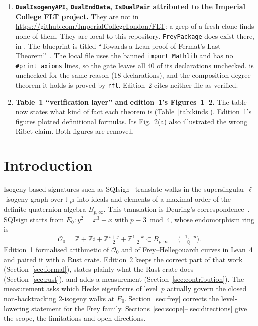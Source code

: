 \documentclass[11pt,a4paper]{article}
\theoremstyle{definition}
\newcommand{\Oz}{\mathcal{O}_0}
\begin{document}
\begin{enumerate}
  \item \textbf{\texttt{DualIsogenyAPI}, \texttt{DualEndData}, \texttt{IsDualPair} attributed to the Imperial College FLT project.} They are not in \url{https://github.com/ImperialCollegeLondon/FLT}: a grep of a fresh clone finds none of them. They are local to this repository. \texttt{FreyPackage} does exist there, in . The blueprint is titled ``Towards a Lean proof of Fermat's Last Theorem''~\cite{BuzzardTaylor}. The local file  uses the banned \texttt{import Mathlib} and has no \texttt{\#print axioms} lines, so the gate leaves all 40 of its declarations unchecked.  is unchecked for the same reason (18 declarations), and the composition-degree theorem it holds is proved by \texttt{rfl}. Edition~2 cites neither file as verified.
  \item \textbf{Table~1 ``verification layer'' and edition~1's Figures~1--2.} The table now states what kind of fact each theorem is (Table~\ref{tab:kinds}). Edition~1's figures plotted definitional formulas. Its Fig.~2(a) also illustrated the wrong Ribet claim. Both figures are removed.
\end{enumerate}

\section{Introduction}
Isogeny-based signatures such as SQIsign~\cite{DeFeo2020,SQIsignSpec} translate walks in the supersingular $\ell$-isogeny graph over $\mathbb F_{p^2}$ into ideals and elements of a maximal order of the definite quaternion algebra $B_{p,\infty}$. This translation is Deuring's correspondence~\cite{Deuring1941,Kohel1996,Voight}. SQIsign starts from $E_0:y^2=x^3+x$ with $p\equiv3\bmod4$, whose endomorphism ring is
\[
\Oz=\mathbb Z+\mathbb Zi+\mathbb Z\tfrac{i+j}{2}+\mathbb Z\tfrac{1+k}{2}\subset B_{p,\infty}=\Big(\tfrac{-1,-p}{\mathbb Q}\Big).
\]
Edition~1 formalised arithmetic of $\Oz$ and of Frey--Hellegouarch curves in Lean~4 and paired it with a Rust crate. Edition~2 keeps the correct part of that work (Section~\ref{sec:formal}), states plainly what the Rust crate does (Section~\ref{sec:rust}), and adds a measurement (Section~\ref{sec:contribution}). The measurement asks which Hecke eigenforms of level~$p$ actually govern the closed non-backtracking 2-isogeny walks at $E_0$. Section~\ref{sec:frey} corrects the level-lowering statement for the Frey family. Sections~\ref{sec:scope}--\ref{sec:directions} give the scope, the limitations and open directions.
\end{document}
